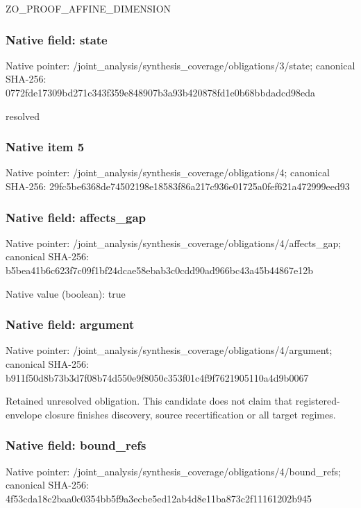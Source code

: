 \documentclass[10pt,a4paper]{article}
\begin{document}
\begingroup\raggedright\sloppy ZO\_\allowbreak{}PROOF\_\allowbreak{}AFFINE\_\allowbreak{}DIMENSION\par\endgroup

\subsubsection{Native field: state}
Native pointer: /joint\_\allowbreak{}analysis/synthesis\_\allowbreak{}coverage/obligations/3/state; canonical SHA-256: 0772fde17309bd271c343f359e848907b3a93b420878fd1e0b68bbdadcd98eda

\begingroup\raggedright\sloppy resolved\par\endgroup

\subsubsection{Native item 5}
Native pointer: /joint\_\allowbreak{}analysis/synthesis\_\allowbreak{}coverage/obligations/4; canonical SHA-256: 29fc5be6368de74502198e18583f86a217c936e01725a0fef621a472999eed93

\subsubsection{Native field: affects\_\allowbreak{}gap}
Native pointer: /joint\_\allowbreak{}analysis/synthesis\_\allowbreak{}coverage/obligations/4/affects\_\allowbreak{}gap; canonical SHA-256: b5bea41b6c623f7c09f1bf24dcae58ebab3c0cdd90ad966bc43a45b44867e12b

Native value (boolean): true

\subsubsection{Native field: argument}
Native pointer: /joint\_\allowbreak{}analysis/synthesis\_\allowbreak{}coverage/obligations/4/argument; canonical SHA-256: b911f50d8b73b3d7f08b74d550e9f8050c353f01c4f9f7621905110a4d9b0067

\begingroup\raggedright\sloppy Retained unresolved obligation. This candidate does not claim that registered-envelope closure finishes discovery,\allowbreak{} source recertification or all target regimes.\par\endgroup

\subsubsection{Native field: bound\_\allowbreak{}refs}
Native pointer: /joint\_\allowbreak{}analysis/synthesis\_\allowbreak{}coverage/obligations/4/bound\_\allowbreak{}refs; canonical SHA-256: 4f53cda18c2baa0c0354bb5f9a3ecbe5ed12ab4d8e11ba873c2f11161202b945
\end{document}
